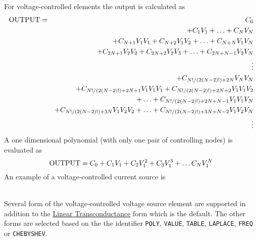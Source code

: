 For voltage-controlled elements the output is calculated as
\begin{eqnarray}
{\rm OUTPUT} & = & C_0 \nonumber\\
         &   & + C_1V_1 + \ldots + C_NV_N\nonumber\\
         &   & + C_{N+1}V_1V_1 + C_{N+2}V_1V_2 + \ldots + C_{N+N}V_1V_N
               \nonumber\\
         &   & + C_{2N+1}V_2V_2 + C_{2N+2}V_2V_3 +\ldots + C_{2N+N-1}V_2V_N
               \nonumber\\
         &   & \vdots \nonumber\\
         &   & + C_{N!/(2(N-2)!)+2N}V_NV_N
               \nonumber\\
         &   & + C_{N!/(2(N-2)!)+2N+1}V_1V_1V_1 +
               C_{N!/(2(N-2)!)+2N+2}V_1V_1V_2\nonumber\\
         &   &\ \ \ \ \ \ \ \ \ + \ldots +
               C_{N!/(2(N-2)!)+2N+N-1}V_1V_1V_N
                     \nonumber\\
         &   & + C_{N!/(2(N-2)!)+3N}V_1V_2V_2 + \ldots +
               C_{N!/(2(N-2)!)+3N+N-2}V_1V_2V_N
                     \nonumber\\
         &   & \vdots\nonumber
\end{eqnarray}
A one dimensional polynomial (with only one pair of controlling
nodes) is evaluated as
\[
{\rm OUTPUT} = C_0 + C_1V_1 + C_2V_1^2 + C_3V_1^3 + \ldots
C_NV_1^N
\]
An example of a voltage-controlled current source is\\[0.1in]
\hspace*{\fill}\\[0.1in]
\newline

Several form of the voltage-controlled voltage source element are
supported
      in addition to the \underline{Linear Transconductance}
      form which is the default.
      The other forms are selected based on the the identifier
      {\tt POLY},
      {\tt VALUE},
      {\tt TABLE},
      {\tt LAPLACE},
      {\tt FREQ} or
      {\tt CHEBYSHEV}.

